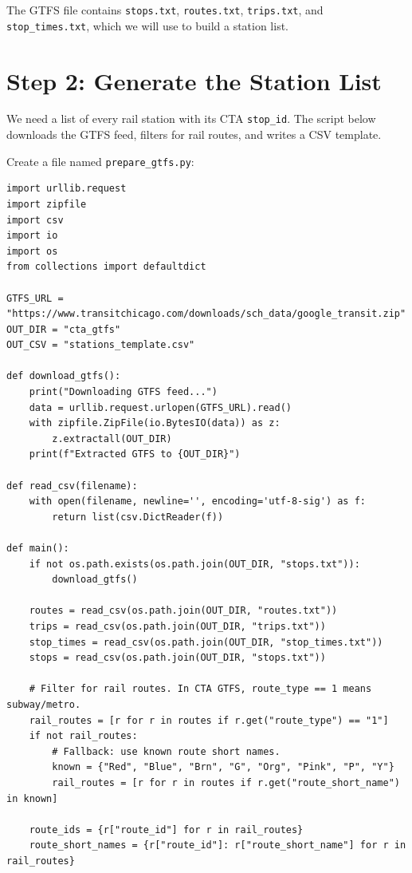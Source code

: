 \documentclass[11pt]{article}
\begin{document}
The GTFS file contains \texttt{stops.txt}, \texttt{routes.txt}, \texttt{trips.txt}, and \texttt{stop\_times.txt}, which we will use to build a station list.

\section{Step 2: Generate the Station List}

We need a list of every rail station with its CTA \texttt{stop\_id}. The script below downloads the GTFS feed, filters for rail routes, and writes a CSV template.

Create a file named \texttt{prepare\_gtfs.py}:

\begin{lstlisting}[style=python,caption={Python script to extract CTA rail stations from GTFS.},label={lst:prepare_gtfs}]
import urllib.request
import zipfile
import csv
import io
import os
from collections import defaultdict

GTFS_URL = "https://www.transitchicago.com/downloads/sch_data/google_transit.zip"
OUT_DIR = "cta_gtfs"
OUT_CSV = "stations_template.csv"

def download_gtfs():
    print("Downloading GTFS feed...")
    data = urllib.request.urlopen(GTFS_URL).read()
    with zipfile.ZipFile(io.BytesIO(data)) as z:
        z.extractall(OUT_DIR)
    print(f"Extracted GTFS to {OUT_DIR}")

def read_csv(filename):
    with open(filename, newline='', encoding='utf-8-sig') as f:
        return list(csv.DictReader(f))

def main():
    if not os.path.exists(os.path.join(OUT_DIR, "stops.txt")):
        download_gtfs()

    routes = read_csv(os.path.join(OUT_DIR, "routes.txt"))
    trips = read_csv(os.path.join(OUT_DIR, "trips.txt"))
    stop_times = read_csv(os.path.join(OUT_DIR, "stop_times.txt"))
    stops = read_csv(os.path.join(OUT_DIR, "stops.txt"))

    # Filter for rail routes. In CTA GTFS, route_type == 1 means subway/metro.
    rail_routes = [r for r in routes if r.get("route_type") == "1"]
    if not rail_routes:
        # Fallback: use known route short names.
        known = {"Red", "Blue", "Brn", "G", "Org", "Pink", "P", "Y"}
        rail_routes = [r for r in routes if r.get("route_short_name") in known]

    route_ids = {r["route_id"] for r in rail_routes}
    route_short_names = {r["route_id"]: r["route_short_name"] for r in rail_routes}


\end{lstlisting}
\end{document}
